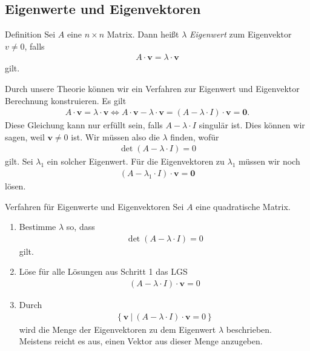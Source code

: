 \newpage

\subsection{Eigenwerte und Eigenvektoren}

\begin{mybox}{Definition}
Sei $A$ eine $n \times n$ Matrix.
Dann heißt $\lambda$ \textit{Eigenwert} zum Eigenvektor $v \neq 0$, falls
\begin{align*}
A \cdot \textbf{v} = \lambda \cdot \textbf{v}
\end{align*}
gilt.
\end{mybox}
\vspace{0.4cm}
Durch unsere Theorie können wir ein Verfahren zur Eigenwert und Eigenvektor Berechnung konstruieren.
Es gilt
\begin{align*}
A \cdot \textbf{v} = \lambda \cdot \textbf{v}
\Leftrightarrow
A \cdot \textbf{v} - \lambda \cdot \textbf{v}= (A - \lambda \cdot I) \cdot \textbf{v} = \textbf{0}.
\end{align*}
Diese Gleichung kann nur erfüllt sein, falls $A- \lambda \cdot I$ singulär ist.
Dies können wir sagen, weil $\textbf{v} \neq 0$ ist.
Wir müssen also die $\lambda$ finden, wofür
\begin{align*}
\det(A- \lambda \cdot I) = 0
\end{align*}
gilt. Sei $\lambda_1$ ein solcher Eigenwert.
Für die Eigenvektoren zu $\lambda_1$ müssen wir noch
\begin{align*}
(A - \lambda_1 \cdot I) \cdot \textbf{v} = \textbf{0}
\end{align*}
lösen.\\
\begin{mybox}{Verfahren für Eigenwerte und Eigenvektoren}
Sei $A$ eine quadratische Matrix.
\renewcommand{\labelenumi}{\theenumi.}
\begin{enumerate}
\item
{}
Bestimme $\lambda$ so, dass
\begin{align*}
\det(A-\lambda\cdot I) = 0 
\end{align*}
gilt.

\item
Löse für alle Lösungen aus Schritt 1 das LGS
\begin{align*}
(A - \lambda \cdot I) \cdot \textbf{v} =0
\end{align*}
\item
{}
Durch
\begin{align*}
\left\lbrace \textbf{v}  \ | \ (A - \lambda \cdot I) \cdot \textbf{v} =0 \right\rbrace
\end{align*}
wird die Menge der Eigenvektoren zu dem Eigenwert $\lambda$ beschrieben.\\
Meistens reicht es aus, einen Vektor aus dieser Menge anzugeben.
\end{enumerate}
\end{mybox}
\newpage
